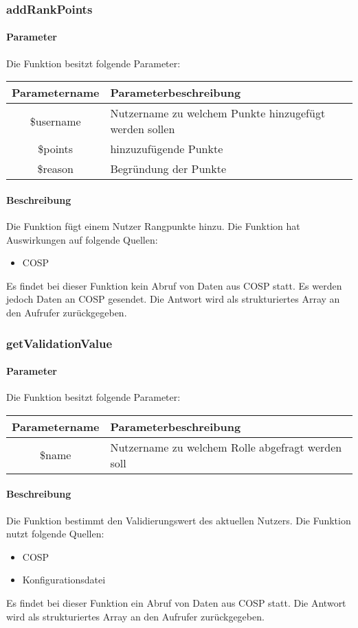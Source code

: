 \subsubsection{addRankPoints}
\paragraph{Parameter} Die Funktion besitzt folgende Parameter:
\begin{table}[H]
	\begin{tabular}{|c|p{11cm}|}
		\hline
		\textbf{Parametername} & \textbf{Parameterbeschreibung} \\ \hline
		\$username & Nutzername zu welchem Punkte hinzugefügt werden sollen \\ \hline
		\$points   & hinzuzufügende Punkte \\ \hline
		\$reason   & Begründung der Punkte \\ \hline
	\end{tabular}
\end{table}
\paragraph{Beschreibung} Die Funktion fügt einem Nutzer Rangpunkte hinzu. Die Funktion hat Auswirkungen auf folgende Quellen:
\begin{itemize}
	\item COSP
\end{itemize}
Es findet bei dieser Funktion kein Abruf von Daten aus {\glqq COSP\grqq} statt. Es werden jedoch Daten an {\glqq COSP\grqq} gesendet. Die Antwort wird als strukturiertes Array an den Aufrufer zurückgegeben.
\subsubsection{getValidationValue}
\paragraph{Parameter} Die Funktion besitzt folgende Parameter:
\begin{table}[H]
	\begin{tabular}{|c|p{11cm}|}
		\hline
		\textbf{Parametername} & \textbf{Parameterbeschreibung} \\ \hline
		\$name & Nutzername zu welchem Rolle abgefragt werden soll \\ \hline
	\end{tabular}
\end{table}
\paragraph{Beschreibung} Die Funktion bestimmt den Validierungswert des aktuellen Nutzers. Die Funktion nutzt folgende Quellen:
\begin{itemize}
	\item COSP
	\item Konfigurationsdatei
\end{itemize}
Es findet bei dieser Funktion ein Abruf von Daten aus {\glqq COSP\grqq} statt. Die Antwort wird als strukturiertes Array an den Aufrufer zurückgegeben.
